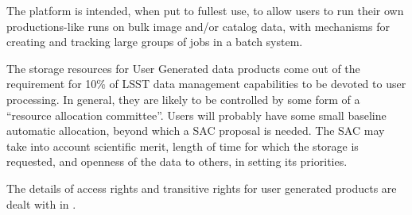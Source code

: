 \documentclass[SE,lsstdraft,toc]{lsstdoc}
\begin{document}
The platform  is intended, when put to fullest use, to allow users to run their own productions-like runs on bulk image and/or catalog data, with mechanisms for creating and tracking large groups of jobs in a batch system.
%


The storage resources for User Generated data products come out of the \SRD requirement for 10\% of LSST data management capabilities to be devoted to user processing. In general, they are likely to be controlled by some form of a ``resource allocation committee''.  Users will probably have some small baseline automatic allocation, beyond which a SAC proposal is needed. The SAC may take into account scientific merit, length of time for which the storage is requested, and openness of the data to others, in setting its priorities.


The details of access rights and transitive rights for user generated products are dealt with in .
\end{document}
